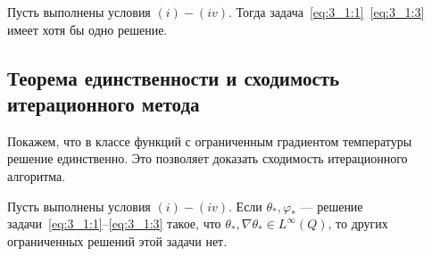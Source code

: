 \begin{theorem}
    \label{th:3_1:1}
    Пусть выполнены условия $(i)-(iv)$.
    Тогда задача~\eqref{eq:3_1:1}~\eqref{eq:3_1:3} имеет хотя бы одно решение.
\end{theorem}

\subsection{Теорема единственности и сходимость итерационного метода}
\label{subsec:ch3/sec1/uniqeness_convergense}
Покажем, что в классе функций с ограниченным градиентом температуры решение единственно.
Это позволяет доказать сходимость итерационного алгоритма.

\begin{theorem}
    \label{th:3_1:2}
    Пусть выполнены условия $(i)-(iv)$.
    Если $\theta_{*}, \varphi_{*}$ — решение
    задачи~\eqref{eq:3_1:1}--\eqref{eq:3_1:3} такое,
    что $\theta_{*}, \nabla \theta_{*} \in L^{\infty }(Q)$,
    то других ограниченных решений этой задачи нет.
\end{theorem}

